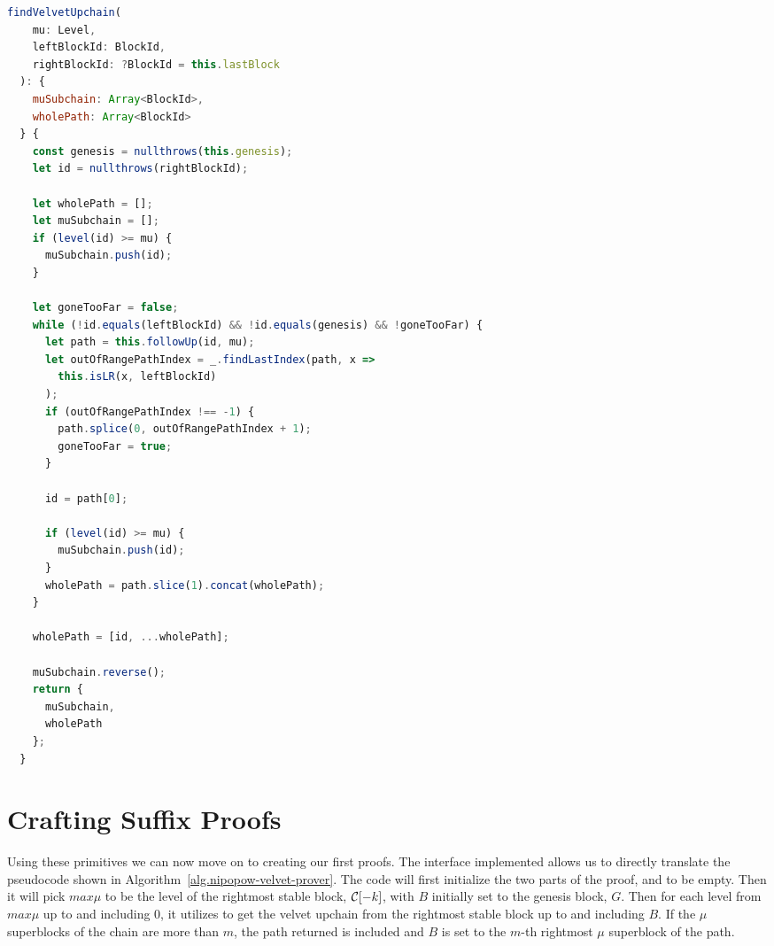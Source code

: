 \begin{lstlisting}[language=Javascript]
  findVelvetUpchain(
    mu: Level,
    leftBlockId: BlockId,
    rightBlockId: ?BlockId = this.lastBlock
  ): {
    muSubchain: Array<BlockId>,
    wholePath: Array<BlockId>
  } {
    const genesis = nullthrows(this.genesis);
    let id = nullthrows(rightBlockId);

    let wholePath = [];
    let muSubchain = [];
    if (level(id) >= mu) {
      muSubchain.push(id);
    }

    let goneTooFar = false;
    while (!id.equals(leftBlockId) && !id.equals(genesis) && !goneTooFar) {
      let path = this.followUp(id, mu);
      let outOfRangePathIndex = _.findLastIndex(path, x =>
        this.isLR(x, leftBlockId)
      );
      if (outOfRangePathIndex !== -1) {
        path.splice(0, outOfRangePathIndex + 1);
        goneTooFar = true;
      }

      id = path[0];

      if (level(id) >= mu) {
        muSubchain.push(id);
      }
      wholePath = path.slice(1).concat(wholePath);
    }

    wholePath = [id, ...wholePath];

    muSubchain.reverse();
    return {
      muSubchain,
      wholePath
    };
  }
\end{lstlisting}

\section{Crafting Suffix Proofs}
Using these primitives we can now move on to creating our first proofs. The interface implemented allows us to directly translate the pseudocode shown in Algorithm~\ref{alg.nipopow-velvet-prover}. The code will first initialize the two parts of the proof,  and  to be empty. Then it will pick $max\mu$ to be the level of the rightmost stable block, $\mathcal{C}[-k]$, with $B$ initially set to the genesis block, $G$. Then for each level from $max\mu$ up to and including 0, it utilizes  to get the velvet upchain from the rightmost stable block up to and including $B$. If the $\mu$ superblocks of the chain are more than $m$, the path returned is included and $B$ is set to the $m$-th rightmost $\mu$ superblock of the path.

